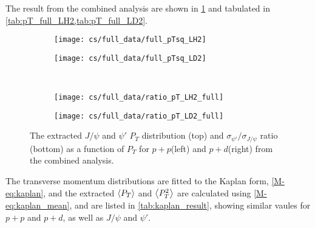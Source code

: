 \documentclass[../main.tex]{subfiles}
\begin{document}
The result from the combined analysis are shown in \cref{fig:pT_combined} and tabulated in \cref{tab:pT_full_LH2,tab:pT_full_LD2}.
\begin{figure}[h!]
	\centering
	\begin{subfigure}{0.45\linewidth}
		\texttt{[image: cs/full\_data/full\_pTsq\_LH2]}
	\end{subfigure}
	\begin{subfigure}{0.45\linewidth}
		\texttt{[image: cs/full\_data/full\_pTsq\_LD2]}
	\end{subfigure}
	\\
	\begin{subfigure}{0.45\linewidth}
		\texttt{[image: cs/full\_data/ratio\_pT\_LH2\_full]}
	\end{subfigure}
	\begin{subfigure}{0.45\linewidth}
		\texttt{[image: cs/full\_data/ratio\_pT\_LD2\_full]}
	\end{subfigure}
	\caption{The extracted $J/\psi$ and $\psi'$ $P_T$ distribution (top) and $\sigma_{\psi'}/\sigma_{J/\psi}$
		ratio (bottom) as a function of $P_T$ for $p+p$(left) and $p+d$(right) from
		the combined analysis.}
	\label{fig:pT_combined}
\end{figure}
\begin{table}[h!]
	\centering
	\caption{Cross section $d\sigma/dp^2_T$ (in \unit{\nano\barn\GeV^{-2} nucleon^{-1}}) and the
		$\sigma_{\psi'}/\sigma_{J/\psi}$ ratio for $p+p$ extracted from the combined analysis, with
		their statistical and systematic uncertainties and the $\expval{p_T}$ (in \unit{\GeV})in each bin.}
	
	\label{tab:pT_full_LH2}
\end{table}
\begin{table}[h!]
	\centering
	\caption{Cross section $d\sigma/dp^2_T$ (in \unit{\nano\barn\GeV^{-2} nucleon^{-1}}) and the
		$\sigma_{\psi'}/\sigma_{J/\psi}$ ratio for $p+d$ extracted from the combined analysis, with
		their statistical and systematic uncertainties and the $\expval{p_T}$ (in \unit{\GeV})in each bin.}
	
	\label{tab:pT_full_LD2}
\end{table}

The transverse momentum distributions are fitted to the Kaplan form, \cref{M-eq:kaplan}, and the extracted
$\expval{P_T}$ and $\expval{P^2_T}$ are calculated using \cref{M-eq:kaplan_mean},
and are listed in \cref{tab:kaplan_result}, showing similar vaules for $p+p$ and $p+d$,
as well as $J/\psi$ and $\psi'$.
\end{document}
